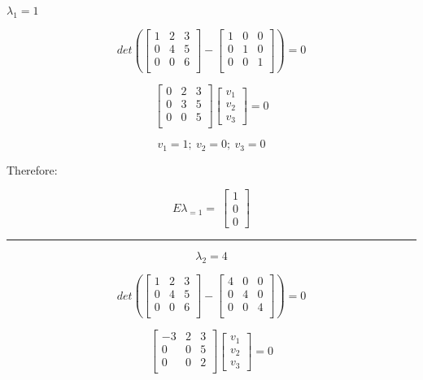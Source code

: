 \documentclass[]{article}
\begin{document}
\(\lambda_1 = 1\)

\[
det( 
\begin{bmatrix}
   1 & 2 & 3 \\
   0 & 4 & 5 \\
   0 & 0 & 6 \\
\end{bmatrix}
-
\begin{bmatrix}
   1 & 0 & 0 \\
   0 & 1  & 0 \\
   0 & 0 & 1 \\
\end{bmatrix}
) = 0
\]

\[
\begin{bmatrix}
   0 & 2 & 3 \\
   0 & 3 & 5 \\
   0 & 0 & 5 \\
\end{bmatrix}
\begin{bmatrix}
v_1 \\
v_2 \\
v_3
\end{bmatrix}
=0
\]

\[v_1 = 1;~v_2 = 0;~v_3 = 0\]

Therefore:

\[
E\lambda_{=1} = \
\begin{bmatrix}
1 \\
0 \\
0
\end{bmatrix}
\]

\begin{center}\rule{0.5\linewidth}{\linethickness}\end{center}

\[\lambda_2 = 4\]

\[
det( 
\begin{bmatrix}
   1 & 2 & 3 \\
   0 & 4 & 5 \\
   0 & 0 & 6 \\
\end{bmatrix}
-
\begin{bmatrix}
   4 & 0 & 0 \\
   0 & 4  & 0 \\
   0 & 0 & 4 \\
\end{bmatrix}
) = 0
\]

\[
\begin{bmatrix}
   -3 & 2 & 3 \\
   0 & 0 & 5 \\
   0 & 0 & 2 \\
\end{bmatrix}
\begin{bmatrix}
v_1 \\
v_2 \\
v_3
\end{bmatrix}
=0
\]
\end{document}
